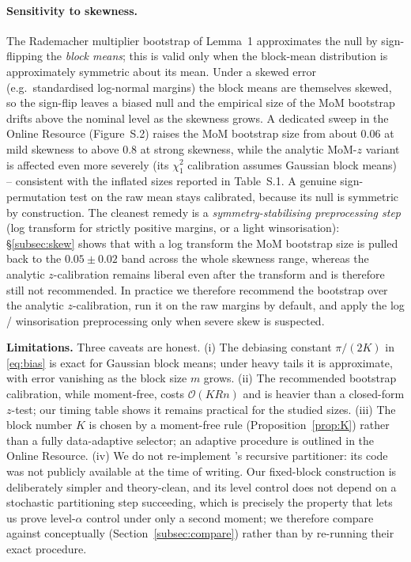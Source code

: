 \documentclass[pdflatex,sn-mathphys-num]{sn-jnl}
\theoremstyle{thmstyleone}%
\theoremstyle{thmstyletwo}%
\theoremstyle{thmstylethree}%
\begin{document}
\paragraph{Sensitivity to skewness.}
The Rademacher multiplier bootstrap of Lemma~1 approximates the null by
sign-flipping the \emph{block means}; this is valid only when the block-mean
distribution is approximately symmetric about its mean. Under a skewed error
(e.g.\ standardised log-normal margins) the block means are themselves skewed,
so the sign-flip leaves a biased null and the empirical size of the MoM bootstrap
drifts above the nominal level as the skewness grows. A dedicated sweep in the
Online Resource (Figure~S.2) raises the MoM bootstrap size from about
$0.06$ at mild skewness to above $0.8$ at strong skewness, while the analytic
MoM-$z$ variant is affected even more severely (its $\chi^2_1$ calibration assumes
Gaussian block means) -- consistent with the inflated sizes reported in
Table~S.1. A genuine sign-permutation test on the raw mean stays calibrated,
because its null is symmetric by construction. The cleanest remedy is a
\emph{symmetry-stabilising preprocessing step} (log transform for strictly
positive margins, or a light winsorisation): \S\ref{subsec:skew} shows that with a
log transform the MoM bootstrap size is pulled back to the $0.05\pm0.02$ band
across the whole skewness range, whereas the analytic $z$-calibration remains
liberal even after the transform and is therefore still not recommended. In
practice we therefore recommend the bootstrap over the analytic $z$-calibration,
run it on the raw margins by default, and apply the log / winsorisation
preprocessing only when severe skew is suspected.

\textbf{Limitations.} Three caveats are honest. (i) The debiasing constant
$\pi/(2K)$ in \eqref{eq:bias} is exact for Gaussian block means; under heavy
tails it is approximate, with error vanishing as the block size $m$ grows.
(ii) The recommended bootstrap calibration, while moment-free, costs
$\mathcal{O}(KRn)$ and is heavier than a closed-form $z$-test; our timing table
shows it remains practical for the studied sizes. (iii) The block number $K$ is
chosen by a moment-free rule (Proposition~\ref{prop:K}) rather than a fully
data-adaptive selector; an adaptive procedure is outlined in the Online Resource.
(iv) We do not re-implement \citeauthor{dai2024}'s \citep{dai2024} recursive partitioner: its code
was not publicly available at the time of writing. Our fixed-block construction
is deliberately simpler and theory-clean, and its level control does not depend
on a stochastic partitioning step succeeding, which is precisely the property
that lets us prove level-$\alpha$ control under only a second moment; we
therefore compare against \citeauthor{dai2024} \citep{dai2024} conceptually
(Section~\ref{subsec:compare}) rather than by re-running their exact procedure.
\end{document}
